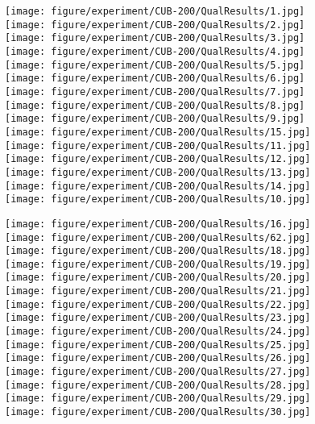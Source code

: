 \documentclass{article} \usepackage{iclr2017_conference,times}
\begin{document}
\begin{figure}[t]
  \center
  \begin{minipage}{1.0\textwidth}
  \texttt{[image: figure/experiment/CUB-200/QualResults/1.jpg]}
  \texttt{[image: figure/experiment/CUB-200/QualResults/2.jpg]}
  \texttt{[image: figure/experiment/CUB-200/QualResults/3.jpg]}
  \texttt{[image: figure/experiment/CUB-200/QualResults/4.jpg]}
  \texttt{[image: figure/experiment/CUB-200/QualResults/5.jpg]}
  \texttt{[image: figure/experiment/CUB-200/QualResults/6.jpg]}
  \texttt{[image: figure/experiment/CUB-200/QualResults/7.jpg]}
  \texttt{[image: figure/experiment/CUB-200/QualResults/8.jpg]}
  \texttt{[image: figure/experiment/CUB-200/QualResults/9.jpg]}
  \texttt{[image: figure/experiment/CUB-200/QualResults/15.jpg]}
  \texttt{[image: figure/experiment/CUB-200/QualResults/11.jpg]}
  \texttt{[image: figure/experiment/CUB-200/QualResults/12.jpg]}
  \texttt{[image: figure/experiment/CUB-200/QualResults/13.jpg]}
  \texttt{[image: figure/experiment/CUB-200/QualResults/14.jpg]}
  \texttt{[image: figure/experiment/CUB-200/QualResults/10.jpg]}
\vspace{-0.35cm}
  \end{minipage}     
  
  \begin{minipage}{1.0\textwidth}
  \texttt{[image: figure/experiment/CUB-200/QualResults/16.jpg]}
  \texttt{[image: figure/experiment/CUB-200/QualResults/62.jpg]}
  \texttt{[image: figure/experiment/CUB-200/QualResults/18.jpg]}
  \texttt{[image: figure/experiment/CUB-200/QualResults/19.jpg]}
  \texttt{[image: figure/experiment/CUB-200/QualResults/20.jpg]}
  \texttt{[image: figure/experiment/CUB-200/QualResults/21.jpg]}
  \texttt{[image: figure/experiment/CUB-200/QualResults/22.jpg]}
  \texttt{[image: figure/experiment/CUB-200/QualResults/23.jpg]}
  \texttt{[image: figure/experiment/CUB-200/QualResults/24.jpg]}
  \texttt{[image: figure/experiment/CUB-200/QualResults/25.jpg]}
  \texttt{[image: figure/experiment/CUB-200/QualResults/26.jpg]}
  \texttt{[image: figure/experiment/CUB-200/QualResults/27.jpg]}
  \texttt{[image: figure/experiment/CUB-200/QualResults/28.jpg]}
  \texttt{[image: figure/experiment/CUB-200/QualResults/29.jpg]}
  \texttt{[image: figure/experiment/CUB-200/QualResults/30.jpg]}
\vspace{-0.35cm}  
  \end{minipage}   
   

\end{figure}
\end{document}
